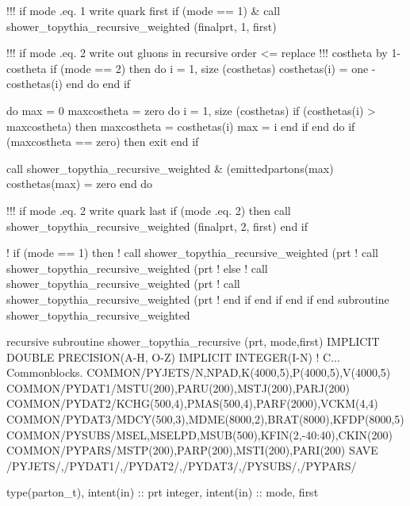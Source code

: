           !!! if mode .eq. 1 write quark first
          if (mode == 1) &
               call shower_topythia_recursive_weighted (finalprt, 1, first)

          !!! if mode .eq. 2 write out gluons in recursive order <= replace
          !!!      costheta by 1- costheta
          if (mode == 2) then
             do i = 1, size (costhetas)
                costhetas(i) = one - costhetas(i)
             end do
          end if

          do
             max = 0
             maxcostheta = zero
             do i = 1, size (costhetas)
                if (costhetas(i) > maxcostheta) then
                   maxcostheta = costhetas(i)
                   max = i
                end if
             end do
             if (maxcostheta == zero) then
                exit
             end if

             call shower_topythia_recursive_weighted &
                  (emittedpartons(max)%
             costhetas(max) = zero
          end do

          !!! if mode .eq. 2 write quark last
          if (mode .eq. 2) then
             call shower_topythia_recursive_weighted (finalprt, 2, first)
          end if

          ! if (mode == 1) then
          !    call shower_topythia_recursive_weighted (prt%
          !    call shower_topythia_recursive_weighted (prt%
          ! else
          !    call shower_topythia_recursive_weighted (prt%
          !    call shower_topythia_recursive_weighted (prt%
          ! end if
       end if
    end if
  end subroutine shower_topythia_recursive_weighted

\eatline
\nwendcode{}\nwdocspar
\nwenddocs{}\plusendmoddef
  recursive subroutine shower_topythia_recursive (prt, mode,first)
    IMPLICIT DOUBLE PRECISION(A-H, O-Z)
    IMPLICIT INTEGER(I-N)
    !    C...  Commonblocks.
    COMMON/PYJETS/N,NPAD,K(4000,5),P(4000,5),V(4000,5)
    COMMON/PYDAT1/MSTU(200),PARU(200),MSTJ(200),PARJ(200)
    COMMON/PYDAT2/KCHG(500,4),PMAS(500,4),PARF(2000),VCKM(4,4)
    COMMON/PYDAT3/MDCY(500,3),MDME(8000,2),BRAT(8000),KFDP(8000,5)
    COMMON/PYSUBS/MSEL,MSELPD,MSUB(500),KFIN(2,-40:40),CKIN(200)
    COMMON/PYPARS/MSTP(200),PARP(200),MSTI(200),PARI(200)
    SAVE /PYJETS/,/PYDAT1/,/PYDAT2/,/PYDAT3/,/PYSUBS/,/PYPARS/

    type(parton_t), intent(in) :: prt
    integer, intent(in) :: mode, first

